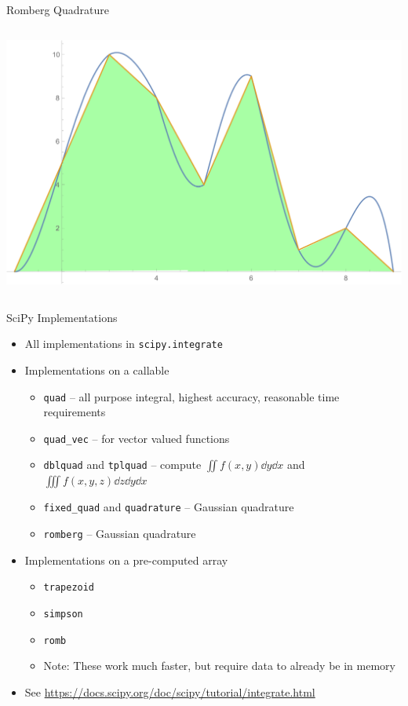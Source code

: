 \begin{frame}{Romberg Quadrature}
\begin{columns}
\includegraphics[width=\linewidth]{./gfx/03-romberg-03}
\end{columns}
%
\end{frame}


\begin{frame}{SciPy Implementations}
%
\begin{itemize}
\item All implementations in \texttt{scipy.integrate}
\item Implementations on a callable
	\begin{itemize}
	\item \texttt{quad} -- all purpose integral, highest accuracy, reasonable time requirements
	\item \texttt{quad\_vec} -- for vector valued functions
	\item \texttt{dblquad} and \texttt{tplquad} -- compute $\iint f(x, y) \dd{y}\dd{x}$ and $\iiint f(x, y, z) \dd{z}\dd{y}\dd{x}$
	\item \texttt{fixed\_quad} and \texttt{quadrature} -- Gaussian quadrature
	\item \texttt{romberg} -- Gaussian quadrature
	\end{itemize}
\item Implementations on a pre-computed array
	\begin{itemize}
	\item \texttt{trapezoid}
	\item \texttt{simpson}
	\item \texttt{romb}
	\item Note: These work much faster, but require data to already be in memory
	\end{itemize}
\item See \url{https://docs.scipy.org/doc/scipy/tutorial/integrate.html}
\end{itemize}
%
\end{frame}


